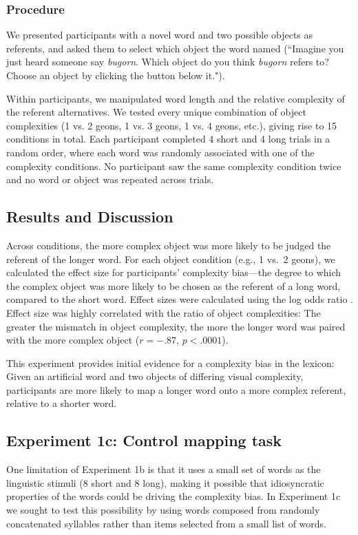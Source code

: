 \documentclass[man]{apa2}
\begin{document}
\subsubsection{Procedure}

We presented participants with a novel word  and two possible objects as referents, and asked them to select which object the word named (``Imagine you just heard someone say {\it bugorn}. Which object do you think  {\it bugorn} refers to? Choose an object by clicking the button below it.").


Within participants, we manipulated word length and the relative complexity of the referent alternatives.  We tested every unique combination of object complexities (1 vs. 2 geons, 1 vs. 3 geons, 1 vs. 4 geons, etc.), giving rise to 15 conditions in total. Each participant completed 4 short and 4 long trials in a random order, where each word was randomly associated with one of the complexity conditions. No participant saw the same complexity condition twice and no word or object was repeated across trials. 

\subsection{Results and Discussion}
Across conditions, the more complex object was more likely to be judged the referent of the longer word. For each object condition (e.g., 1 vs.\ 2 geons), we calculated the effect size for participants' complexity bias---the degree to which the complex object was more likely to be chosen as the referent of a long word, compared to the short word. Effect sizes were calculated using the log odds ratio \cite{sanchez2003effect}. Effect size was highly correlated with the ratio of object complexities: The greater the mismatch in object complexity, the more the longer word was paired with the more complex object ($r = -.87$, $p < .0001$). 

This experiment provides initial evidence for a complexity bias in the lexicon: Given an artificial word and two objects of differing visual complexity, participants are more likely to map a longer word onto a more complex referent, relative to a shorter word.

				
\subsection{\textbf{Experiment 1c: Control mapping task}}
One limitation of Experiment 1b is that it uses a small set of words as the linguistic stimuli (8 short and 8 long), making it possible that idiosyncratic properties of the words could be driving the complexity bias. In Experiment 1c we sought to test this possibility by using words composed from randomly concatenated syllables rather than items selected from a small list of words.
\end{document}
